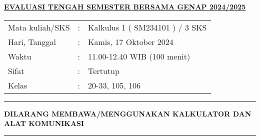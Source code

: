 \documentclass[11pt,openany,a4paper]{article}
\renewcommand{\headrulewidth}{0pt}
\renewcommand{\footrulewidth}{0pt}
\begin{document}
\newpage
\renewcommand{\arraystretch}{1}
\fancyhead{}
\fancyfoot{}
\fancyhead[r]{}
\renewcommand{\headrulewidth}{0pt}
\renewcommand{\footrulewidth}{0pt}
\begin{center}
    {\underline{\textbf{\MakeUppercase{Evaluasi Tengah Semester Bersama Genap 2024/2025}}}}
\end{center}

\begin{center}
    \begin{tabular}{lcl}
        Mata kuliah/SKS & : & Kalkulus 1 ( SM234101 ) / 3 SKS \\
        Hari, Tanggal   & : & Kamis, 17 Oktober 2024          \\
        Waktu           & : & 11.00-12.40 WIB (100 menit)     \\
        Sifat           & : & Tertutup                        \\
        Kelas           & : & 20-33, 105, 106
    \end{tabular}
\end{center}

\noindent\rule{\textwidth}{2.pt}

\setlength{\parindent}{5pt}
\setlength{\parindent}{5pt}
\setlength{\parindent}{5pt}
\par \textbf{\small\MakeUppercase{dilarang membawa/menggunakan kalkulator dan alat komunikasi}}
\par {}
\noindent\rule{\textwidth}{2.pt}
\end{document}
